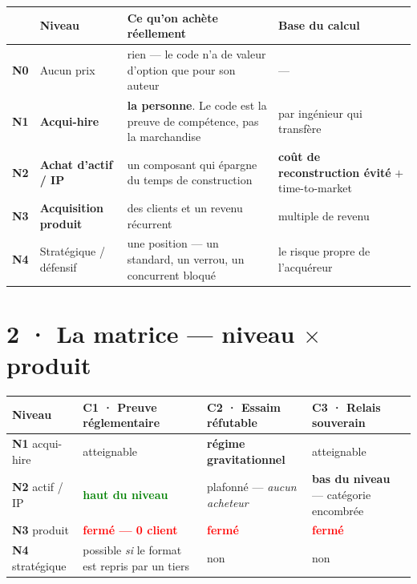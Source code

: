 \documentclass[10pt]{article}
\newcommand{\best}[1]{\textcolor{green}{\textbf{#1}}}
\newcommand{\pire}[1]{\textcolor{red}{\textbf{#1}}}
\newcommand{\x}{$\times$}
\begin{document}
\renewcommand{\arraystretch}{1.22}
\begin{center}\small
\begin{tabular}{@{}c >{\raggedright\arraybackslash}p{3.5cm} >{\raggedright\arraybackslash}p{6.6cm} >{\raggedright\arraybackslash}p{4.7cm}@{}}
\toprule
& \textbf{Niveau} & \textbf{Ce qu'on achète réellement} & \textbf{Base du calcul} \\
\midrule
\textbf{N0} & Aucun prix & rien --- le code n'a de valeur d'option que pour son auteur & --- \\
\textbf{N1} & \textbf{Acqui-hire} & \textbf{la personne}. Le code est la preuve de compétence, pas la marchandise & par ingénieur qui transfère \\
\textbf{N2} & \textbf{Achat d'actif / IP} & un composant qui épargne du temps de construction & \textbf{coût de reconstruction évité} $+$ time-to-market \\
\textbf{N3} & \textbf{Acquisition produit} & des clients et un revenu récurrent & multiple de revenu \\
\textbf{N4} & Stratégique / défensif & une position --- un standard, un verrou, un concurrent bloqué & le risque propre de l'acquéreur \\
\bottomrule
\end{tabular}
\end{center}

\section{2 · La matrice --- niveau \x{} produit}

\renewcommand{\arraystretch}{1.24}
\begin{center}\small
\begin{tabular}{@{}>{\raggedright\arraybackslash}p{2.9cm} >{\raggedright\arraybackslash}p{4.3cm} >{\raggedright\arraybackslash}p{4.3cm} >{\raggedright\arraybackslash}p{4.3cm}@{}}
\toprule
\textbf{Niveau} & \textbf{C1 · Preuve réglementaire} & \textbf{C2 · Essaim réfutable} & \textbf{C3 · Relais souverain} \\
\midrule
\textbf{N1} acqui-hire & atteignable & \textbf{régime gravitationnel} & atteignable \\
\textbf{N2} actif / IP & \best{haut du niveau} & plafonné --- \emph{aucun acheteur} & \textbf{bas du niveau} --- catégorie encombrée \\
\textbf{N3} produit & \pire{fermé --- 0 client} & \pire{fermé} & \pire{fermé} \\
\textbf{N4} stratégique & possible \emph{si} le format est repris par un tiers & non & non \\
\bottomrule
\end{tabular}
\end{center}
\end{document}
